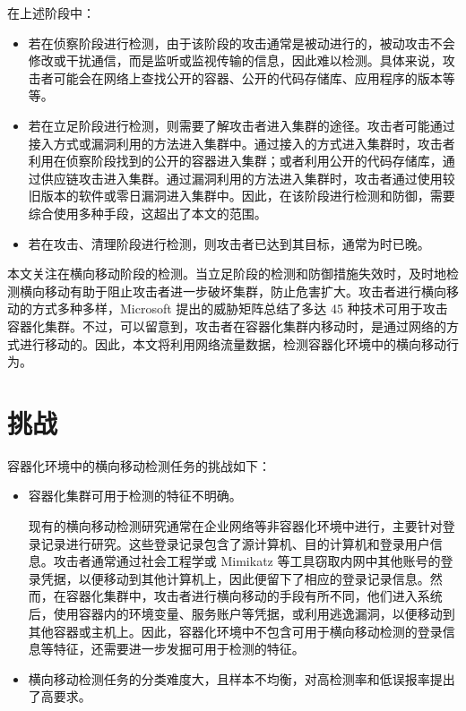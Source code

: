 {在上述阶段中：

\begin{itemize}
    \item 若在侦察阶段进行检测，由于该阶段的攻击通常是被动进行的，被动攻击不会修改或干扰通信，而是监听或监视传输的信息\citep{app10113874}，因此难以检测。具体来说，攻击者可能会在网络上查找公开的容器、公开的代码存储库\citep{oshrat2024}、应用程序的版本等等。
    \item 若在立足阶段进行检测，则需要了解攻击者进入集群的途径。攻击者可能通过接入方式或漏洞利用的方法进入集群中\citep{7550947}。通过接入的方式进入集群时，攻击者利用在侦察阶段找到的公开的容器进入集群；或者利用公开的代码存储库，通过供应链攻击进入集群\citep{cicd}。通过漏洞利用的方法进入集群时，攻击者通过使用较旧版本的软件或零日漏洞进入集群中\citep{7550947}。因此，在该阶段进行检测和防御，需要综合使用多种手段，这超出了本文的范围。
    \item 若在攻击、清理阶段进行检测，则攻击者已达到其目标，通常为时已晚。
\end{itemize}

本文关注在横向移动阶段的检测。当立足阶段的检测和防御措施失效时，及时地检测横向移动有助于阻止攻击者进一步破坏集群，防止危害扩大。攻击者进行横向移动的方式多种多样，Microsoft 提出的威胁矩阵\citep{yossi2020threat}总结了多达 45 种技术可用于攻击容器化集群。不过，可以留意到，攻击者在容器化集群内移动时，是通过网络的方式进行移动的。因此，本文将利用网络流量数据，检测容器化环境中的横向移动行为。

\section{挑战}

容器化环境中的横向移动检测任务的挑战如下：

\begin{itemize}
    \item {容器化集群可用于检测的特征不明确。
    
    现有的横向移动检测研究通常在企业网络等非容器化环境中进行，主要针对登录记录进行研究。这些登录记录包含了源计算机、目的计算机和登录用户信息。攻击者通常通过社会工程学或 Mimikatz\citep{mimikatz} 等工具窃取内网中其他账号的登录凭据，以便移动到其他计算机上，因此便留下了相应的登录记录信息。然而，在容器化集群中，攻击者进行横向移动的手段有所不同，他们进入系统后，使用容器内的环境变量、服务账户等凭据，或利用逃逸漏洞，以便移动到其他容器或主机上\citep{oshrat2024}。因此，容器化环境中不包含可用于横向移动检测的登录信息等特征，还需要进一步发掘可用于检测的特征。
    }
    \item {横向移动检测任务的分类难度大，且样本不均衡，对高检测率和低误报率提出了高要求。

}
\end{itemize}}
